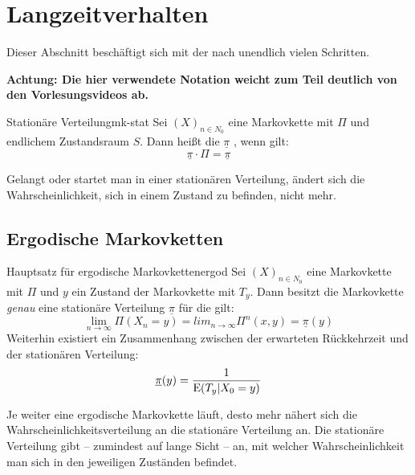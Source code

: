\section{Langzeitverhalten}

\newcommand{\stat}{\underline{\pi}} %

Dieser Abschnitt beschäftigt sich mit der  nach unendlich vielen Schritten.

\textbf{Achtung: Die hier verwendete
Notation weicht zum Teil deutlich von den Vorlesungsvideos ab.}

\begin{definition}{Stationäre Verteilung}{mk-stat}
Sei $(X)_{n\in N_0}$ eine Markovkette mit 
$\Pi$ und endlichem Zustandsraum $S$. Dann heißt die
 $\stat$ ,
wenn gilt:
\[
\stat\cdot\Pi = \stat
\]
\end{definition}

Gelangt oder startet man in einer stationären Verteilung, ändert sich die
Wahrscheinlichkeit, sich in einem Zustand zu befinden, nicht mehr.

\subsection{Ergodische Markovketten}

\begin{theorem}{Hauptsatz für ergodische Markovketten}{ergod}
Sei $(X)_{n\in N_0}$ eine  Markovkette mit
 $\Pi$ und $y$ ein Zustand der Markovkette
mit  $T_y$. Dann
besitzt die Markovkette \emph{genau} eine stationäre Verteilung $\stat$
für die gilt:
\[
\lim_{n\to\infty}\Pi(X_n = y) = lim_{n\to\infty}\Pi^n(x, y) = \stat(y)
\]
Weiterhin existiert ein Zusammenhang zwischen der erwarteten Rückkehrzeit und
der stationären Verteilung:
\[
\stat(y) = \frac{1}{\E(T_y|X_0=y)}
\]
\end{theorem}

Je weiter eine ergodische Markovkette läuft, desto mehr nähert sich die
Wahrscheinlichkeitsverteilung an die stationäre Verteilung an. Die stationäre
Verteilung gibt – zumindest auf lange Sicht – an, mit welcher Wahrscheinlichkeit
man sich in den jeweiligen Zuständen befindet.

